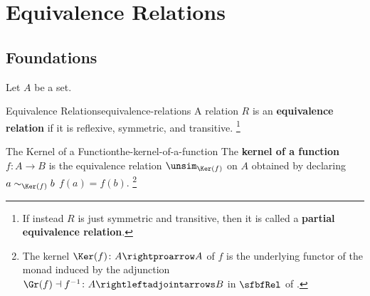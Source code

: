 \section{Equivalence Relations}\label{section-equivalence-relations}
\subsection{Foundations}\label{subsection-equivalence-relations-foundations}
Let $A$ be a set.
\begin{definition}{Equivalence Relations}{equivalence-relations}%
    A relation $R$ is an \textbf{equivalence relation} if it is reflexive, symmetric, and transitive.%
    \footnote{%
        If instead $R$ is just symmetric and transitive, then it is called a \textbf{partial equivalence relation}.
        \par\vspace*{\TCBBoxCorrection}
    }%
\end{definition}
\begin{example}{The Kernel of a Function}{the-kernel-of-a-function}%
    The \textbf{kernel of a function $f\colon A\to B$} is the equivalence relation $\unsim_{\Ker(f)}$ on $A$ obtained by declaring $a\sim_{\Ker(f)}b$ \textiff $f(a)=f(b)$.%
    \footnote{%
        The kernel $\Ker(f)\colon A\rightproarrow A$ of $f$ is the underlying functor of the monad induced by the adjunction $\Gr(f)\dashv f^{-1}\colon A\rightleftadjointarrows B$ in $\sfbfRel$ of .
        \par\vspace*{\TCBBoxCorrection}
    }%
\end{example}
